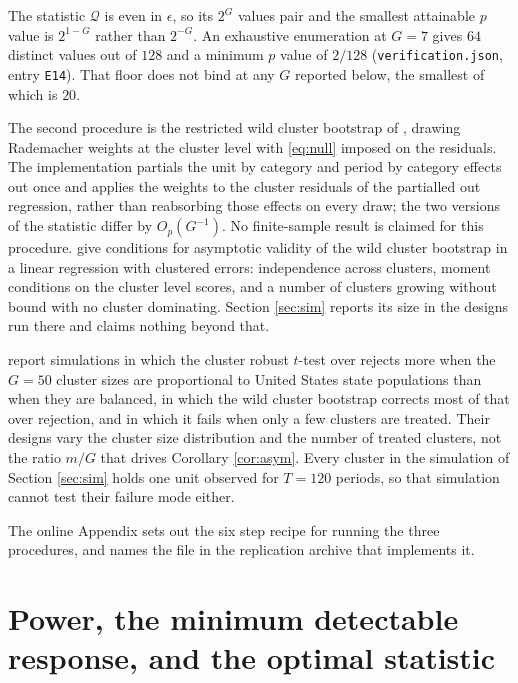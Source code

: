 \documentclass[12pt]{article}
\theoremstyle{definition}
\numberwithin{equation}{section}
\begin{document}
The statistic $\mathcal{Q}$ is even in $\epsilon$, so its $2^G$ values pair and
the smallest attainable $p$ value is $2^{1-G}$ rather than $2^{-G}$. An
exhaustive enumeration at $G = 7$ gives $64$ distinct values out of $128$ and a
minimum $p$ value of $2/128$ (\texttt{verification.json}, entry \texttt{E14}).
That floor does not bind at any $G$ reported below, the smallest of which is
$20$.

The second procedure is the restricted wild cluster bootstrap of
\citet{cameron2008bootstrap}, drawing Rademacher weights at the cluster level
with \eqref{eq:null} imposed on the residuals. The implementation partials the
unit by category and period by category effects out once and applies the weights
to the cluster residuals of the partialled out regression, rather than
reabsorbing those effects on every draw; the two versions of the statistic
differ by $O_p(G^{-1})$. No finite-sample result is claimed for this procedure.
\citet{djogbenou2019asymptotic} give conditions for asymptotic validity of the
wild cluster bootstrap in a linear regression with clustered errors:
independence across clusters, moment conditions on the cluster level scores, and
a number of clusters growing without bound with no cluster dominating. Section
\ref{sec:sim} reports its size in the designs run there and claims nothing
beyond that.

\citet{mackinnon2017wild} report simulations in which the cluster robust
$t$-test over rejects more when the $G = 50$ cluster sizes are proportional to
United States state populations than when they are balanced, in which the wild
cluster bootstrap corrects most of that over rejection, and in which it fails
when only a few clusters are treated. Their designs vary the cluster size
distribution and the number of treated clusters, not the ratio $m/G$ that drives
Corollary \ref{cor:asym}. Every cluster in the simulation of Section
\ref{sec:sim} holds one unit observed for $T = 120$ periods, so that simulation
cannot test their failure mode either.

The online Appendix sets out the six step recipe for running the three
procedures, and names the file in the replication archive that implements it.

\section{Power, the minimum detectable response, and the optimal statistic}
\label{sec:power}
\end{document}

